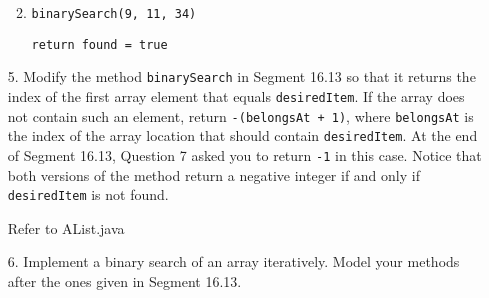\documentclass[10pt]{article}
\begin{document}
\begin{enumerate}
\begin{enumerate}
           			
           			\vspace{0.5cm}
           			\item \texttt{binarySearch(9, 11, 34)}
           			
           				
           				\vspace{0.5cm}
           				\texttt{return found = true}
           		\end{enumerate}
	
		\item[5.] Modify the method \texttt{binarySearch} in Segment 16.13 so that it returns the index of the first array element that equals \texttt{desiredItem}. If the array does not contain such an element, return \texttt{-(belongsAt + 1)}, where \texttt{belongsAt} is the index of the array location that should contain \texttt{desiredItem}. At the end of Segment 16.13, Question 7 asked you to return \texttt{-1} in this case. Notice that both versions of the method return a negative integer if and only if \texttt{desiredItem} is not found.
			
			\vspace{0.5cm}
			Refer to AList.java
			\vspace{0.5cm}
				
		\item[6.] Implement a binary search of an array iteratively. Model your methods after the ones given in Segment 16.13.
			

\end{enumerate}
\end{document}
